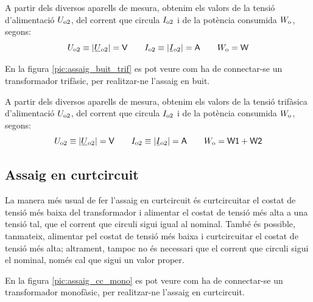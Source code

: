 A partir dels diversos aparells de mesura, obtenim els valors de la
tensió d'alimentació $U_\mathrm{o2}$, del corrent que circula
$I_\mathrm{o2}$ i de la potència consumida $W_\mathrm{o}$, segons:
\begin{equation}
    U\ped{o2}\equiv|\cmplx{U}\ped{o2}|=\textsf{V} \qquad
    I\ped{o2}\equiv|\cmplx{I}\ped{o2}|=\textsf{A}
    \qquad W\ped{o}=\textsf{W}
\end{equation}

En la figura \vref{pic:assaig_buit_trif} es pot veure com ha de
connectar-se un transformador trifàsic, per  realitzar-ne l'assaig en buit.

\begin{center}
    
    \label{pic:assaig_buit_trif}
\end{center}


A partir dels diversos aparells de mesura, obtenim els valors de la
tensió trifàsica d'alimentació $U_\mathrm{o2}$, del corrent que circula
$I_\mathrm{o2}$ i de la potència consumida $W_\mathrm{o}$, segons:
\begin{equation}
    U\ped{o2}\equiv|\cmplx{U}\ped{o2}|=\textsf{V} \qquad
    I\ped{o2}\equiv|\cmplx{I}\ped{o2}|=\textsf{A} \qquad
    W\ped{o}=\textsf{W1}+\textsf{W2}
\end{equation}

\subsection{Assaig en curtcircuit}

La manera més usual de fer l'assaig en curtcircuit és
curtcircuitar el costat de tensió més baixa del transformador i
alimentar el costat de tensió més alta a  una tensió tal, que el corrent
que circuli sigui igual al nominal. També és possible, tanmateix,
alimentar pel costat de  tensió més baixa i curtcircuitar el costat de
 tensió més alta; altrament, tampoc no és necessari que el corrent
que circuli sigui el nominal, només cal que sigui un valor proper.

En la figura \vref{pic:assaig_cc_mono} es pot veure com ha de
connectar-se un transformador monofàsic, per realitzar-ne l'assaig en curtcircuit.


\begin{center}
    
    \label{pic:assaig_cc_mono} \
\end{center}

